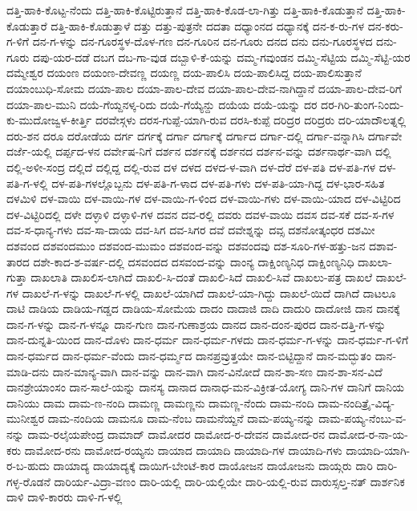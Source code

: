 ದತ್ತಿ-ಹಾಕಿ-ಕೊಟ್ಟ-ನೆಂದು
ದತ್ತಿ-ಹಾಕಿ-ಕೊಟ್ಟಿರುತ್ತಾನೆ
ದತ್ತಿ-ಹಾಕಿ-ಕೊಡ-ಲಾ-ಗಿತ್ತು
ದತ್ತಿ-ಹಾಕಿ-ಕೊಡುತ್ತಾನೆ
ದತ್ತಿ-ಹಾಕಿ-ಕೊಡುತ್ತಾರೆ
ದತ್ತಿ-ಹಾಕಿ-ಕೊಡುತ್ತಾಳೆ
ದತ್ತು
ದತ್ತು-ಪುತ್ರನೇ
ದದತಾ
ದಧ್ಯಾಂನದ
ದಧ್ಯಾನಕ್ಕೆ
ದನ-ಕ-ರು-ಗಳ
ದನ-ಕರು-ಗ-ಳಿಗೆ
ದನ-ಗ-ಳನ್ನು
ದನ-ಗೂರಸ್ಥಳ-ದೊಳ-ಗಣ
ದನ-ಗೂರಿನ
ದನ-ಗೂರು
ದನದ
ದನು
ದನು-ಗೂರಸ್ಥಳದ
ದನು-ಗೂರು
ದಪು-ಯರ-ದಡೆ
ದಬಗ
ದಬ-ಗಾ-ವುಡ
ದಬ್ಬಾಳಿ-ಕೆ-ಯನ್ನು
ದಮ್ಮ-ಗವುಂಡನ
ದಮ್ಮಿ-ಸೆಟ್ಟಿಯ
ದಮ್ಮಿ-ಸೆಟ್ಟಿ-ಯರ
ದಮ್ಮೇಶ್ವರ
ದಯಂಣ
ದಯಂಣ-ದೇವಣ್ಣ
ದಯಣ್ಣ
ದಯ-ಪಾಲಿಸಿ
ದಯ-ಪಾಲಿಸಿದ್ದ
ದಯ-ಪಾಲಿಸುತ್ತಾನೆ
ದಯಾಂಬುಧಿ-ಸೋಮ
ದಯಾ-ಪಾಲ
ದಯಾ-ಪಾಲ-ದೇವ
ದಯಾ-ಪಾಲ-ದೇವ-ನಾಗಿದ್ದಾನೆ
ದಯಾ-ಪಾಲ-ದೇವ-ರಿಗೆ
ದಯಾ-ಪಾಲ-ಮುನಿ
ದಯೆ-ಗೆಯ್ದನಳ್ಕ-ರಿದು
ದಯೆ-ಗೆಯ್ಯೆನ್ದು
ದಯೆಯ
ದಯೆ-ಯನ್ನು
ದರ
ದರ-ಗಿರಿ-ತುಂಗ-ನಿಂದು-ಕು-ಮುದೋಜ್ವಳ-ಕೀರ್ತ್ತಿ
ದರವೇಸ್ಗಳು
ದರಸ-ಗುಪ್ಪೆ-ಯಾಗಿ-ರುವ
ದರಸಿ-ಕುಪ್ಪೆ
ದರಿದ್ರರ
ದರಿದ್ರರು
ದರಿ-ಯಾದೌಲತ್ನಲ್ಲಿ
ದರು-ಶನ
ದರೂ
ದರೋಡೆಯ
ದರ್ಗ
ದರ್ಗಕ್ಕೆ
ದರ್ಗಾ
ದರ್ಗಾಕ್ಕೆ
ದರ್ಗಾದ
ದರ್ಗಾ-ದಲ್ಲಿ
ದರ್ಗಾ-ವನ್ನಾಗಿಸಿ
ದರ್ಗಾವೇ
ದರ್ಜೆ-ಯಲ್ಲಿ
ದರ್ಪ್ಪದ-ಳನ
ದರ್ವೇಷ-ನಿಗೆ
ದರ್ಶನ
ದರ್ಶನಕ್ಕೆ
ದರ್ಶನದ
ದರ್ಶನ-ವನ್ನು
ದರ್ಶನಾರ್ಥ-ವಾಗಿ
ದಲ್ಲಿ
ದಲ್ಲಿ-ಅಳೀ-ಸಂದ್ರ
ದಲ್ಲಿದೆ
ದಲ್ಲಿದ್ದ
ದಲ್ಲಿ-ರುವ
ದಳ
ದಳದ
ದಳದ-ಳ-ವಾಗಿ
ದಳ-ದೆರೆ
ದಳ-ಪತಿ
ದಳ-ಪತಿ-ಗಳ
ದಳ-ಪತಿ-ಗ-ಳಲ್ಲಿ
ದಳ-ಪತಿ-ಗಳಲ್ಲೊಬ್ಬನು
ದಳ-ಪತಿ-ಗ-ಳಾದ
ದಳ-ಪತಿ-ಗಳು
ದಳ-ಪತಿ-ಯಾ-ಗಿದ್ದ
ದಳ-ಭಾರ-ಸಹಿತ
ದಳಮಿಳಿ
ದಳ-ವಾಯಿ
ದಳ-ವಾಯಿ-ಗಳ
ದಳ-ವಾಯಿ-ಗ-ಳಿಂದ
ದಳ-ವಾಯಿ-ಗಳು
ದಳ-ವಾಯಿ-ಯಾದ
ದಳ-ವಿಟ್ಟಿರಿದ
ದಳ-ವಿಟ್ಟಿರಿದಲ್ಲಿ
ದಳೇ
ದಳ್ಳಾಳಿ
ದಳ್ಳಾಳಿ-ಗಳ
ದವನ
ದವ-ರಲ್ಲಿ
ದವರು
ದವಳ-ವಾಯಿ
ದವಸ
ದವ-ಸಕೆ
ದವ-ಸ-ಗಳ
ದವ-ಸ-ಧಾನ್ಯ-ಗಳು
ದವ-ಸಾ-ದಾಯ
ದವ-ಸಿಗ
ದವ-ಸಿಗರ
ದವೆ
ದವೇಶ್ನನ್ನು
ದವ್ಸ
ದಶನೋತ್ಕಂಧರ
ದಶಮೀ
ದಶವಂದ
ದಶವಂದಮುಂ
ದಶವಂದ-ಮುಮಂ
ದಶವಂದ-ವನ್ನು
ದಶವಂದವು
ದಶ-ಸೂರಿ-ಗಳ-ಹತ್ತು-ಜನ
ದಶಾವ-ತಾರದ
ದಶೇ-ಕಾದ-ಶ-ವರ್ಷ-ದಲ್ಲಿ
ದಸವಂದದ
ದಸವಂದ-ವನ್ನು
ದಾಂನ್ಯ
ದಾಕ್ಷಿಂಣ್ಯನಿಧ
ದಾಕ್ಷಿಂಣ್ಯನಿಧಿ
ದಾಖಲಾ-ಗುತ್ತಾ
ದಾಖಲಾತಿ
ದಾಖಲಿಸ-ಲಾಗಿದೆ
ದಾಖಲಿ-ಸಿ-ದಂತೆ
ದಾಖಲಿ-ಸಿದೆ
ದಾಖಲಿ-ಸಿವೆ
ದಾಖಲು-ಪತ್ರ
ದಾಖಲೆ
ದಾಖಲೆ-ಗಳ
ದಾಖಲೆ-ಗ-ಳನ್ನು
ದಾಖಲೆ-ಗ-ಳಲ್ಲಿ
ದಾಖಲೆ-ಯಾಗಿದೆ
ದಾಖಲೆ-ಯಾ-ಗಿದ್ದು
ದಾಖಲೆ-ಯಿದೆ
ದಾಗಿದೆ
ದಾಟಲೂ
ದಾಟಿ
ದಾಡಿಯ
ದಾಡಿಯ-ಗಡ್ಡದ
ದಾಡಿಯ-ಸೋಮೆಯ
ದಾದಂ
ದಾದಾಜಿ
ದಾದಿ
ದಾದುರಿ
ದಾದೋಜಿ
ದಾನ
ದಾನಕ್ಕೆ
ದಾನ-ಗ-ಳನ್ನು
ದಾನ-ಗ-ಳನ್ನೂ
ದಾನ-ಗುಣ
ದಾನ-ಗುಣಾಶ್ರಯ
ದಾನದ
ದಾನ-ದಂನ-ಪುರದ
ದಾನ-ದತ್ತಿ-ಗ-ಳನ್ನು
ದಾನ-ದುನ್ನತಿ-ಯಿಂದ
ದಾನ-ದೊಳು
ದಾನ-ಧರ್ಮ
ದಾನ-ಧರ್ಮ-ಗಳದು
ದಾನ-ಧರ್ಮ-ಗ-ಳನ್ನು
ದಾನ-ಧರ್ಮ-ಗ-ಳಿಗೆ
ದಾನ-ಧರ್ಮದ
ದಾನ-ಧರ್ಮ-ವೆಂದು
ದಾನ-ಧರ್ಮ್ಮದ
ದಾನಪ್ರವ್ರುತ್ತಯೇ
ದಾನ-ಬಿಟ್ಟಿದ್ದಾನೆ
ದಾನ-ಮದ್ಭುತಂ
ದಾನ-ಮಾಡಿ-ದನು
ದಾನ-ಮಾನ್ಯ-ವಾಗಿ
ದಾನ-ವನ್ನು
ದಾನ-ವಾಗಿ
ದಾನ-ವಿನೋದೆ
ದಾನ-ಶಾ-ಸಣ
ದಾನ-ಶಾ-ಸನ-ವಿದೆ
ದಾನಶ್ರೇಯಾಂಸಂ
ದಾನ-ಸಾಲೆ-ಯನ್ನು
ದಾನಸ್ಯ
ದಾನಾದ
ದಾನಾಧ-ಮನ-ವಿಕ್ರೀತ-ಯೋಗ್ಯ
ದಾನಿ-ಗಳ
ದಾನಿಗೆ
ದಾನಿಯ
ದಾನಿಯು
ದಾಮ
ದಾಮ-ಣ-ನಂದಿ
ದಾಮಣ್ಣ
ದಾಮಣ್ಣನು
ದಾಮಣ್ಣ-ನೆಂದು
ದಾಮ-ನಂದಿ
ದಾಮ-ನಂದಿತ್ರೈ-ವಿದ್ಯ-ಮುನೀಶ್ವರ
ದಾಮ-ನಂದಿಯ
ದಾಮನೂ
ದಾಮ-ನೆಂಬ
ದಾಮನೆಯ್ದನೆ
ದಾಮ-ಪಯ್ಯ-ನನ್ನು
ದಾಮ-ಪಯ್ಯ-ನೆಂಬು-ವ-ನನ್ನು
ದಾಮ-ರಲೈಯಪೇಂದ್ರ
ದಾಮಾದ್
ದಾಮೋದರ
ದಾಮೋದ-ರ-ದೇವನ
ದಾಮೋದ-ರನ
ದಾಮೋದ-ರ-ನಾ-ಯ-ಕರು
ದಾಮೋದ-ರನು
ದಾಮೋದ-ರಯ್ಯನು
ದಾಯಾದ
ದಾಯಾದಿ
ದಾಯಾದಿ-ಗಳ
ದಾಯಾದಿ-ಗಳು
ದಾಯಾದಿ-ಯಾಗಿ-ರ-ಬ-ಹುದು
ದಾಯಾದ್ಯ
ದಾಯಾದ್ಯಕ್ಕೆ
ದಾಯಿಗ-ಬೇಂಟೆ-ಕಾರ
ದಾಯೋಜನ
ದಾಯೋಜನು
ದಾಯ್ಗರು
ದಾರಿ
ದಾರಿ-ಗಳ್ಳ-ರೊಡನೆ
ದಾರಿರ್ಯ-ವಿದ್ರಾ-ವಣಂ
ದಾರಿ-ಯಲ್ಲಿ
ದಾರಿ-ಯಲ್ಲಿಯೇ
ದಾರಿ-ಯಲ್ಲಿ-ರುವ
ದಾರುಸ್ಸಲ್ತ-ನತ್
ದಾರ್ಶನಿಕ
ದಾಳಿ
ದಾಳಿ-ಕಾರರು
ದಾಳಿ-ಗ-ಳಲ್ಲಿ
